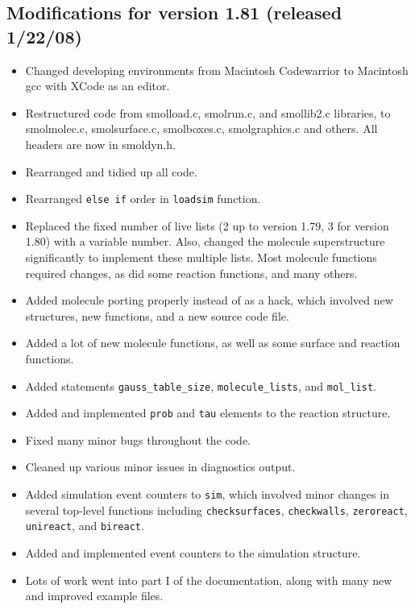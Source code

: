\documentclass {scrbook}
\newcommand {\ttt} {\texttt}
\begin{document}
\subsection{Modifications for version 1.81 (released 1/22/08)}
\begin{itemize}
\item Changed developing environments from Macintosh Codewarrior to Macintosh gcc with XCode as an editor.
\item Restructured code from smolload.c, smolrun.c, and smollib2.c libraries, to smolmolec.c, smolsurface.c, smolboxes.c, smolgraphics.c and others. All headers are now in smoldyn.h.
\item Rearranged and tidied up all code.
\item Rearranged \ttt{else if} order in \ttt{loadsim} function.
\item Replaced the fixed number of live lists (2 up to version 1.79, 3 for version 1.80) with a variable number. Also, changed the molecule superstructure significantly to implement these multiple lists. Most molecule functions required changes, as did some reaction functions, and many others.
\item Added molecule porting properly instead of as a hack, which involved new structures, new functions, and a new source code file.
\item Added a lot of new molecule functions, as well as some surface and reaction functions.
\item Added statements \ttt{gauss\_table\_size}, \ttt{molecule\_lists}, and \ttt{mol\_list}.
\item Added and implemented \ttt{prob} and \ttt{tau} elements to the reaction structure.
\item Fixed many minor bugs throughout the code.
\item Cleaned up various minor issues in diagnostics output.
\item Added simulation event counters to \ttt{sim}, which involved minor changes in several top-level functions including \ttt{checksurfaces}, \ttt{checkwalls}, \ttt{zeroreact}, \ttt{unireact}, and \ttt{bireact}.
\item Added and implemented event counters to the simulation structure.
\item Lots of work went into part I of the documentation, along with many new and improved example files.
\end{itemize}
\end{document}
